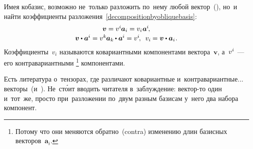\begin{otherlanguage}{russian}
\begin{tcolorbox}
\par\end{tcolorbox}

Имея кобазис, возможно не~только разложить по~нему любой вектор~(), но~и найти коэффициенты разложения~\eqref{decompositionbyobliquebasis}:
\begin{equation}\begin{array}{c}
\bm{v} = v^{i} \hspace{-0.1ex} \bm{a}_i = v_{i} \hspace{0.1ex} \bm{a}^{\hspace{-0.05ex}i} \hspace{-0.25ex}, \\[0.16em]
\bm{v} \dotp \bm{a}^{\hspace{-0.05ex}i} = v^{k} \hspace{-0.1ex} \bm{a}_k \hspace{-0.1ex} \dotp \bm{a}^{\hspace{-0.05ex}i} = v^{i} \hspace{-0.25ex}, \:\;
v_{i} \hspace{-0.1ex} = \bm{v} \dotp \bm{a}_i \hspace{0.1ex}.
\end{array}\end{equation}
\noindent Коэффициенты~${v_i}$ называются ко\-вариант\-ными компонентами вектора~$\bm{v}$, а~${v^i \hspace{-0.25ex}}$~--- его контра\-вариант\-ными%
\footnote{Потому что они меняются обратно~(contra) изменению длин базисных векторов~${\bm{a}_i}$.}\hspace{-0.2ex}
компонентами.

Есть литература о~тензорах, где различают ко\-вариант\-ные и~контра\-вариант\-ные... векторы~(и~). Не~ст\'{о}ит вводить читателя в~заблуждение: вектор\hbox{-}то один и~тот~же, просто при~разложении по~двум разным базисам у~него два набора компонент.




\end{otherlanguage}
